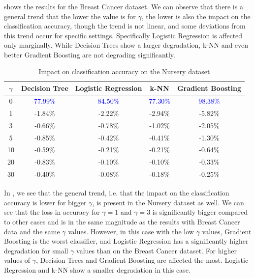 \documentclass[runningheads]{llncs}
\begin{document}
 shows the results for the Breast Cancer dataset.
We can observe that there is a general trend that the lower the value is for $\gamma$, the lower is also the impact on the classification accuracy, though the trend is not linear, and some deviations from this trend occur for specific settings.
Specifically Logistic Regression is affected only marginally. While Decision Trees show a larger degradation, k-NN and even better Gradient Boosting are not degrading significantly.

\begin{table}[h]
\centering
\caption{Impact on classification accuracy on the Nursery dataset}
\label{tab:ml-nursery}
\begin{tabular}{@{}c|cccc@{}}
\toprule
$\gamma$ & Decision Tree & Logistic Regression & k-NN    & Gradient Boosting \\ \midrule
0 & \textcolor{blue}{77.99\%} & \textcolor{blue}{84.50\%} & \textcolor{blue}{77.30\%} & \textcolor{blue}{98.38\%} \\
\hline
1 & -1.84\% & -2.22\% & -2.94\% & -5.82\% \\
3 & -0.66\% & -0.78\% & -1.02\% & -2.05\% \\
5     & -0.85\%       & -0.42\%             & -0.41\% & -1.30\%           \\
10    & -0.59\%       & -0.21\%             & -0.21\% & -0.64\%           \\
20    & -0.83\%       & -0.10\%             & -0.10\% & -0.33\%           \\
30    & -0.40\%       & -0.08\%             & -0.18\% & -0.25\%           \\ \bottomrule
\end{tabular}
\end{table}

In , we see that the general trend, i.e. that the impact on the classification accuracy is lower for bigger $\gamma$, is present in the Nursery dataset as well. 
We can see that the loss in accuracy for $\gamma=1$ and $\gamma=3$ is significantly bigger compared to other cases and is in the same magnitude as the results with Breast Cancer data and the same $\gamma$ values. However, in this case with the low $\gamma$ values, Gradient Boosting is the worst classifier, and Logistic Regression has a significantly higher degradation for small $\gamma$ values than on the Breast Cancer dataset.
For higher values of $\gamma$, Decision Trees and Gradient Boosting are affected the most. Logistic Regression and k-NN show a smaller degradation in this case.
\end{document}
